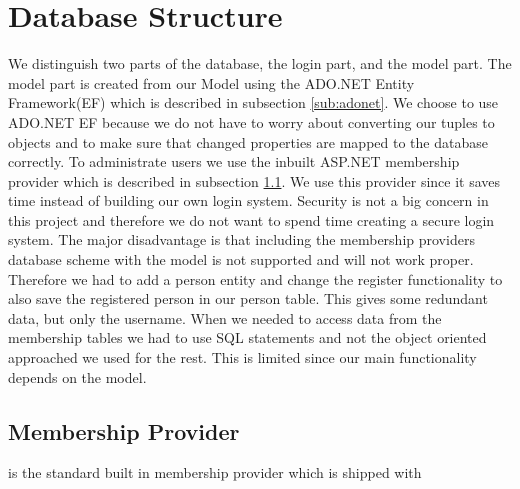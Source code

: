 \section{Database Structure}
\label{sec:databasestructure}

We distinguish two parts of the database, the login part, and the model part. 
The model part is created from our Model  using the ADO.NET Entity Framework(EF) which is described in subsection \ref{sub:adonet}. 
We choose to use ADO.NET EF because we do not have to worry about converting our tuples to objects and to make sure that changed properties are mapped to the database correctly.  
To administrate users we use the inbuilt ASP.NET membership provider which is described in subsection \ref{sub:membershipprovider}. 
We use this provider since it saves time instead of building our own login system. 
Security is not a big concern in this project and therefore we do not want to spend time creating a secure login system. 
The major disadvantage is that including the membership providers database scheme with the model is not supported and will not work proper. 
Therefore we had to add a person entity and change the register functionality to also save the registered person in our person table. 
This gives some redundant data, but only the username. 
When we needed to access data from the membership tables we had to use SQL statements and not the object oriented approached we used for the rest. This is limited since our main functionality depends on the model. 





\subsection{Membership Provider}
\label{sub:membershipprovider}
is the standard built in membership provider which is shipped with 